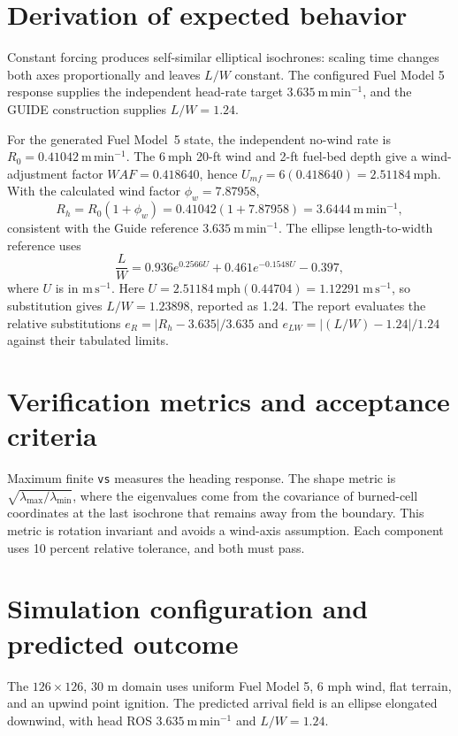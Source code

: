 \section{Derivation of expected behavior}

Constant forcing produces self-similar elliptical isochrones: scaling time changes both axes proportionally and leaves \(L/W\) constant.  The configured Fuel Model 5 response supplies the independent head-rate target \(3.635~\mathrm{m\,min^{-1}}\), and the GUIDE construction supplies \(L/W=1.24\).

For the generated Fuel Model~5 state, the independent no-wind rate is
\(R_0=0.41042~\mathrm{m\,min^{-1}}\).  The \(6~\mathrm{mph}\) 20-ft wind
and 2-ft fuel-bed depth give a wind-adjustment factor
\(WAF=0.418640\), hence
\(U_{mf}=6(0.418640)=2.51184~\mathrm{mph}\).  With the calculated wind
factor \(\phi_w=7.87958\),
\[
 R_h=R_0(1+\phi_w)=0.41042(1+7.87958)
     =3.6444~\mathrm{m\,min^{-1}},
\]
consistent with the Guide reference \(3.635~\mathrm{m\,min^{-1}}\).
The ellipse length-to-width reference uses
\[
 \frac{L}{W}=0.936e^{0.2566U}+0.461e^{-0.1548U}-0.397,
\]
where \(U\) is in \(\mathrm{m\,s^{-1}}\).  Here
\(U=2.51184~\mathrm{mph}(0.44704)=1.12291~\mathrm{m\,s^{-1}}\), so
substitution gives \(L/W=1.23898\), reported as 1.24.  The report evaluates the relative substitutions
\(e_R=|R_h-3.635|/3.635\) and
\(e_{LW}=|(L/W)-1.24|/1.24\) against their tabulated limits.

\section{Verification metrics and acceptance criteria}

Maximum finite \texttt{vs} measures the heading response.  The shape metric is \(\sqrt{\lambda_{\max}/\lambda_{\min}}\), where the eigenvalues come from the covariance of burned-cell coordinates at the last isochrone that remains away from the boundary.  This metric is rotation invariant and avoids a wind-axis assumption.  Each component uses 10 percent relative tolerance, and both must pass.

\section{Simulation configuration and predicted outcome}

The \(126\times126\), 30 m domain uses uniform Fuel Model 5, 6 mph wind, flat terrain, and an upwind point ignition.  The predicted arrival field is an ellipse elongated downwind, with head ROS \(3.635~\mathrm{m\,min^{-1}}\) and \(L/W=1.24\).

